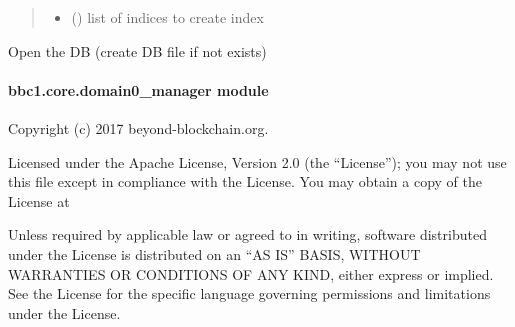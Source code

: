 \documentclass[letterpaper,10pt,english]{sphinxmanual}
\begin{document}
\begin{fulllineitems}
\begin{fulllineitems}
\begin{quote}
\begin{description}
\begin{itemize}
\item {} 
 () \textendash{} list of indices to create index

\end{itemize}

\end{description}\end{quote}

\end{fulllineitems}


\begin{fulllineitems}
\label{\detokenize{bbc1.core.data_handler:bbc1.core.data_handler.SqliteAdaptor.open_db}}
Open the DB (create DB file if not exists)

\end{fulllineitems}


\end{fulllineitems}



\paragraph{bbc1.core.domain0\_manager module}
\label{\detokenize{bbc1.core.domain0_manager::doc}}\label{\detokenize{bbc1.core.domain0_manager:bbc1-core-domain0-manager-module}}\label{\detokenize{bbc1.core.domain0_manager:module-bbc1.core.domain0_manager}}
Copyright (c) 2017 beyond-blockchain.org.

Licensed under the Apache License, Version 2.0 (the “License”);
you may not use this file except in compliance with the License.
You may obtain a copy of the License at
\begin{quote}

\end{quote}

Unless required by applicable law or agreed to in writing, software
distributed under the License is distributed on an “AS IS” BASIS,
WITHOUT WARRANTIES OR CONDITIONS OF ANY KIND, either express or implied.
See the License for the specific language governing permissions and
limitations under the License.
\end{document}
